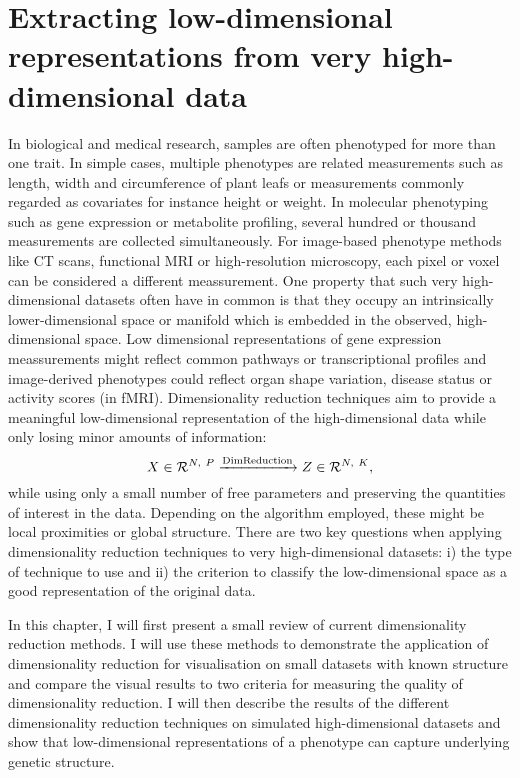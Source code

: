 \chapter{Extracting low-dimensional representations from very high-dimensional data}
\label{chapter:DimReduction}
In biological and medical research, samples are often phenotyped for more than one trait. In simple cases, multiple phenotypes are related measurements such as length, width and circumference of plant leafs or measurements commonly regarded as covariates for instance height or weight. In molecular phenotyping such as gene expression or metabolite profiling, several hundred or thousand measurements are collected simultaneously.  For image-based phenotype methods like CT scans, functional MRI or high-resolution microscopy, each pixel or voxel can be considered a different meassurement. One property that such very high-dimensional datasets often have in common is that they occupy an intrinsically lower-dimensional space or manifold which is embedded in the observed, high-dimensional space. Low dimensional representations of gene expression meassurements might reflect common pathways or transcriptional profiles and image-derived phenotypes could reflect organ shape variation, disease status or activity scores (in fMRI).  Dimensionality reduction techniques aim to provide a meaningful low-dimensional representation  of the high-dimensional data  while only losing minor amounts of information:
\begin{equation}
X \in \mathcal{R}^{N,~P} \xrightarrow{\text{DimReduction}} Z \in \mathcal{R}^{N,~K},
\end{equation}
while using only a small number of free parameters and preserving the quantities of interest in the data. Depending on the algorithm employed, these might be local proximities or global structure. There are two key questions when applying dimensionality reduction techniques to very high-dimensional datasets: i) the type of technique to use and ii) the criterion to classify the low-dimensional space as a good representation of the original data. 

In this chapter, I will first present a small review of current dimensionality reduction methods. I will use these methods to demonstrate the application of dimensionality reduction for visualisation on small datasets with known structure and compare the visual results to two criteria for measuring the quality of dimensionality reduction. I will then describe the results of the different dimensionality reduction techniques on simulated high-dimensional datasets and show that low-dimensional representations of a phenotype can capture underlying genetic structure. 

